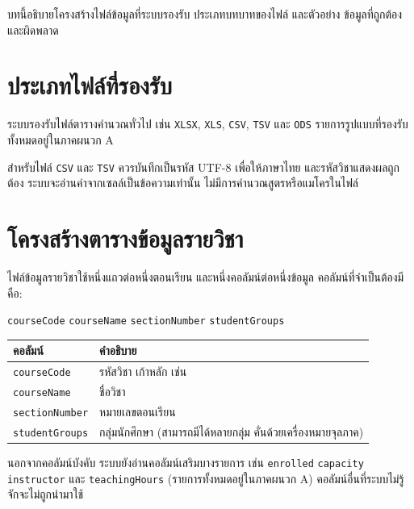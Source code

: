 
\noindent บทนี้อธิบายโครงสร้างไฟล์ข้อมูลที่ระบบรองรับ ประเภทบทบาทของไฟล์ และตัวอย่าง
ข้อมูลที่ถูกต้องและผิดพลาด

\section{ประเภทไฟล์ที่รองรับ}

ระบบรองรับไฟล์ตารางคำนวณทั่วไป เช่น \texttt{XLSX}, \texttt{XLS}, \texttt{CSV},
\texttt{TSV} และ \texttt{ODS} รายการรูปแบบที่รองรับทั้งหมดอยู่ในภาคผนวก A

สำหรับไฟล์ \texttt{CSV} และ \texttt{TSV} ควรบันทึกเป็นรหัส UTF-8 เพื่อให้ภาษาไทย
และรหัสวิชาแสดงผลถูกต้อง ระบบจะอ่านค่าจากเซลล์เป็นข้อความเท่านั้น
ไม่มีการคำนวณสูตรหรือแมโครในไฟล์

\section{โครงสร้างตารางข้อมูลรายวิชา}

ไฟล์ข้อมูลรายวิชาใช้หนึ่งแถวต่อหนึ่งตอนเรียน และหนึ่งคอลัมน์ต่อหนึ่งข้อมูล
คอลัมน์ที่จำเป็นต้องมีคือ:

\begin{center}
\texttt{courseCode} \quad \texttt{courseName} \quad \texttt{sectionNumber} \quad
\texttt{studentGroups}
\end{center}

\begin{longtable}{L{4cm}L{10.5cm}}
\toprule
\textbf{คอลัมน์} & \textbf{คำอธิบาย} \\
\midrule
\texttt{courseCode} & รหัสวิชา เก้าหลัก เช่น  \\
\texttt{courseName} & ชื่อวิชา \\
\texttt{sectionNumber} & หมายเลขตอนเรียน \\
\texttt{studentGroups} & กลุ่มนักศึกษา (สามารถมีได้หลายกลุ่ม คั่นด้วยเครื่องหมายจุลภาค) \\
\bottomrule
\end{longtable}

นอกจากคอลัมน์บังคับ ระบบยังอ่านคอลัมน์เสริมบางรายการ เช่น \texttt{enrolled}
\texttt{capacity} \texttt{instructor} และ \texttt{teachingHours}
(รายการทั้งหมดอยู่ในภาคผนวก A) คอลัมน์อื่นที่ระบบไม่รู้จักจะไม่ถูกนำมาใช้

